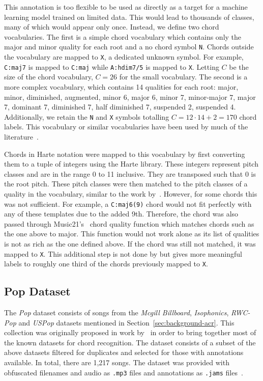 This annotation is too flexible to be used as directly as a target for a machine learning model trained on limited data. This would lead to thousands of classes, many of which would appear only once. Instead, we define two chord vocabularies. The first is a simple chord vocabulary which contains only the major and minor quality for each root and a no chord symbol \texttt{N}. Chords outside the vocabulary are mapped to \texttt{X}, a dedicated unknown symbol. For example, \texttt{C:maj7} is mapped to \texttt{C:maj} while \texttt{A:hdim7/5} is mapped to \texttt{X}. Letting $C$ be the size of the chord vocabulary, $C=26$ for the small vocabulary. The second is a more complex vocabulary, which contains 14 qualities for each root: major, minor, diminished, augmented, minor 6, major 6, minor 7, minor-major 7, major 7, dominant 7, diminished 7, half diminished 7, suspended 2, suspended 4. Additionally, we retain the \texttt{N} and \texttt{X} symbols totalling $C=12\cdot14 + 2 = 170$ chord labels. This vocabulary or similar vocabularies have been used by much of the literature~\citep{StructuredTraining,FourTimelyInsights,ACRLargeVocab1}.

Chords in Harte notation were mapped to this vocabulary by first converting them to a tuple of integers using the Harte library. These integers represent pitch classes and are in the range 0 to 11 inclusive. They are transposed such that 0 is the root pitch. These pitch classes were then matched to the pitch classes of a quality in the vocabulary, similar to the work by~\citet{StructuredTraining}. However, for some chords this was not sufficient. For example, a \texttt{C:maj6(9)} chord would not fit perfectly with any of these templates due to the added 9th. Therefore, the chord was also passed through Music21's~\citep{music21} chord quality function which matches chords such as the one above to major. This function would not work alone as its list of qualities is not as rich as the one defined above. If the chord was still not matched, it was mapped to \texttt{X}. This additional step is not done by \citet{StructuredTraining} but gives more meaningful labels to roughly one third of the chords previously mapped to \texttt{X}.

\subsection{Pop Dataset}

The \emph{Pop} dataset consists of songs from the \emph{Mcgill Billboard}, \emph{Isophonics}, \emph{RWC-Pop} and \emph{USPop} datasets mentioned in Section~\ref{sec:background-acr}. This collection was originally proposed in work by~\citet{FourTimelyInsights} in order to bring together most of the known datasets for chord recognition. The dataset consists of a subset of the above datasets filtered for duplicates and selected for those with annotations available. In total, there are 1,217 songs. The dataset was provided with obfuscated filenames and audio as \texttt{.mp3} files and annotations as \texttt{.jams} files~\citep{JAMS}. 

